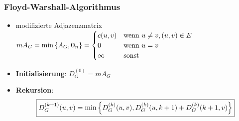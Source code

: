 \documentclass{beamer}
\begin{document}
\begin{frame} \frametitle{Floyd-Warshall-Algorithmus}
	\begin{itemize}
		\item modifizierte Adjazenzmatrix $mA_G = \min\left\{ A_G, \mathbf{0}_n \right\} = \begin{cases}
		c(u,v) & \text{wenn } u \neq v, (u,v) \in E \\
		0 & \text{wenn } u = v \\
		\infty & \text{sonst}
		\end{cases}$
		\item \textbf{Initialisierung}: $D_G^{(0)} = mA_G$
		\item \textbf{Rekursion}:
		\begin{equation*}
			\boxed{D_G^{(k+1)}(u,v) = \min\left\{ D_G^{(k)}(u,v) , D_G^{(k)}(u,k+1) + D_G^{(k)}(k+1,v) \right\}}
		\end{equation*}
	\end{itemize}
\end{frame}
\end{document}
